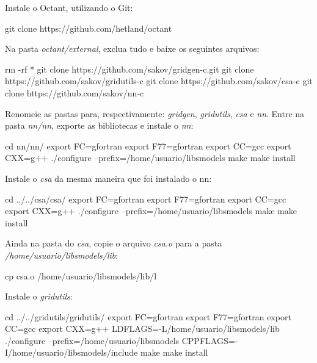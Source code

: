 \noindent Instale o Octant, utilizando o Git:
\bigskip

\begin{bashcode}
git clone https://github.com/hetland/octant
\end{bashcode}
\bigskip

\noindent Na pasta \textit{octant/external}, exclua tudo e baixe os seguintes arquivos:
\bigskip

\begin{bashcode}
rm -rf *
git clone https://github.com/sakov/gridgen-c.git
git clone https://github.com/sakov/gridutils-c
git clone https://github.com/sakov/csa-c
git clone https://github.com/sakov/nn-c
\end{bashcode}
\bigskip

\noindent Renomeie as pastas para, respectivamente: \textit{gridgen}, \textit{gridutils}, \textit{csa} e \textit{nn}. Entre na pasta \textit{nn/nn}, exporte as bibliotecas e instale o \textit{nn}:
\bigskip

\begin{bashcode}
cd nn/nn/
export FC=gfortran
export F77=gfortran
export CC=gcc
export CXX=g++
./configure --prefix=/home/usuario/libsmodels
make
make install
\end{bashcode}
\bigskip

\noindent Instale o \textit{csa} da mesma maneira que foi instalado o nn:
\bigskip

\begin{bashcode}
cd ../../csa/csa/
export FC=gfortran
export F77=gfortran
export CC=gcc
export CXX=g++
./configure --prefix=/home/usuario/libsmodels
make
make install
\end{bashcode}
\bigskip

\noindent Ainda na pasta do \textit{csa}, copie o arquivo \textit{csa.o} para a pasta \textit{/home/usuario/libsmodels/lib}:
\bigskip

\begin{bashcode}
cp csa.o /home/usuario/libsmodels/lib/l
\end{bashcode}
\bigskip

\noindent Instale o \textit{gridutils}:
\bigskip

\begin{bashcode}[fontsize=\scriptsize]
cd ../../gridutils/gridutils/
export FC=gfortran
export F77=gfortran
export CC=gcc
export CXX=g++
LDFLAGS=-L/home/usuario/libsmodels/lib
./configure --prefix=/home/usuario/libsmodels CPPFLAGS=-I/home/usuario/libsmodels/include
make
make install
\end{bashcode}
\bigskip

